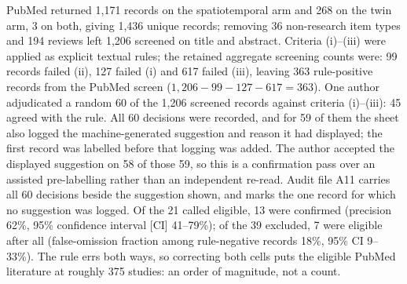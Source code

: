 \documentclass[journal]{IEEEtran}
\begin{document}
PubMed returned 1{,}171 records on the spatiotemporal arm and 268 on the twin arm, 3 on both, giving 1{,}436 unique records; removing 36 non-research item types and 194 reviews left 1{,}206 screened on title and abstract. Criteria (i)--(iii) were applied as explicit textual rules; the retained aggregate screening counts were: 99 records failed (ii), 127 failed (i) and 617 failed (iii), leaving 363 rule-positive records from the PubMed screen ($1{,}206-99-127-617=363$). One author adjudicated a random 60 of the 1{,}206 screened records against criteria (i)--(iii): 45 agreed with the rule. All 60 decisions were recorded, and for 59 of them the sheet also logged the machine-generated suggestion and reason it had displayed; the first record was labelled before that logging was added. The author accepted the displayed suggestion on 58 of those 59, so this is a confirmation pass over an assisted pre-labelling rather than an independent re-read. Audit file A11 carries all 60 decisions beside the suggestion shown, and marks the one record for which no suggestion was logged. Of the 21 called eligible, 13 were confirmed (precision 62\%, 95\% confidence interval [CI] 41--79\%); of the 39 excluded, 7 were eligible after all (false-omission fraction among rule-negative records 18\%, 95\% CI 9--33\%). The rule errs both ways, so correcting both cells puts the eligible PubMed literature at roughly 375 studies: an order of magnitude, not a count.
\end{document}
